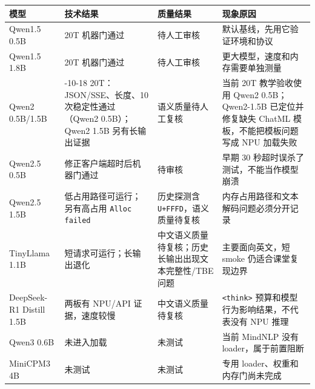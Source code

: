 \begin{longtable}[]{@{}
  >{\raggedright\arraybackslash}p{}
  >{\raggedright\arraybackslash}p{}
  >{\raggedright\arraybackslash}p{}
  >{\raggedright\arraybackslash}p{}@{}}
\toprule\noalign{}
\begin{minipage}[b]{\linewidth}\raggedright
模型
\end{minipage} & \begin{minipage}[b]{\linewidth}\raggedright
技术结果
\end{minipage} & \begin{minipage}[b]{\linewidth}\raggedright
质量结果
\end{minipage} & \begin{minipage}[b]{\linewidth}\raggedright
现象原因
\end{minipage} \\
\midrule\noalign{}
\endhead
\bottomrule\noalign{}
\endlastfoot
Qwen1.5 0.5B & 20T 机器门通过 & 待人工审核 &
默认基线，先用它验证环境和协议 \\
Qwen1.5 1.8B & 20T 机器门通过 & 待人工审核 &
更大模型，速度和内存需要单独测量 \\
Qwen2 0.5B/1.5B & 2026-10-18 20T：JSON/SSE、长度、10 次稳定性通过（Qwen2
0.5B）；Qwen2 1.5B 另有长输出证据 & 语义质量待人工复核 & 当前 20T
教学验收使用 Qwen2 0.5B；Qwen2-1.5B 已定位并修复缺失 ChatML
模板，不能把模板问题写成 NPU 加载失败 \\
Qwen2.5 0.5B & 修正客户端超时后机器门通过 & 待审核 & 早期 30
秒超时误杀了测试，不能当作模型崩溃 \\
Qwen2.5 1.5B & 低占用路径可运行；另有高占用
\passthrough{\lstinline!Alloc failed!} & 历史探测含
\passthrough{\lstinline!U+FFFD!}，语义质量待复核 &
内存占用路径和文本解码问题必须分开记录 \\
TinyLlama 1.1B & 短请求可运行；长输出退化 &
中文语义质量待复核；历史长输出出现文本完整性/TBE 问题 & 主要面向英文，短
smoke 仍适合课堂复现边界 \\
DeepSeek-R1 Distill 1.5B & 两板有 NPU/API 证据，速度较慢 &
中文语义质量待复核 & \passthrough{\lstinline!<think>!}
预算和模型行为影响结果，不代表没有 NPU 推理 \\
Qwen3 0.6B & 未进入加载 & 未测试 & 当前 MindNLP 没有
loader，属于前置阻断 \\
MiniCPM3 4B & 未测试 & 未测试 & 专用 loader、权重和内存门尚未完成 \\
\end{longtable}

